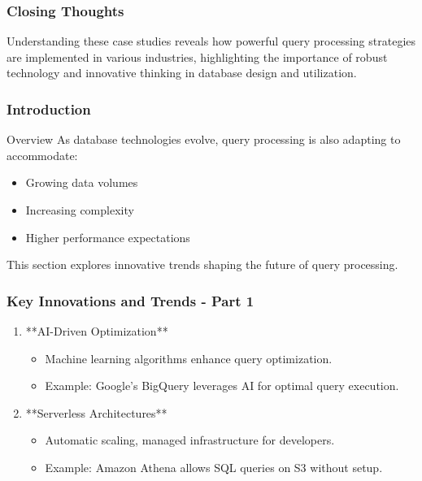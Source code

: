 \documentclass[aspectratio=169]{beamer}
\begin{document}
\begin{frame}
    \frametitle{Closing Thoughts}
    Understanding these case studies reveals how powerful query processing strategies are implemented in various industries, highlighting the importance of robust technology and innovative thinking in database design and utilization.
\end{frame}

\begin{frame}[fragile]
    \frametitle{Introduction}
    \begin{block}{Overview}
        As database technologies evolve, query processing is also adapting to accommodate:
        \begin{itemize}
            \item Growing data volumes
            \item Increasing complexity
            \item Higher performance expectations
        \end{itemize}
        This section explores innovative trends shaping the future of query processing.
    \end{block}
\end{frame}

\begin{frame}[fragile]
    \frametitle{Key Innovations and Trends - Part 1}
    \begin{enumerate}
        \item **AI-Driven Optimization**
        \begin{itemize}
            \item Machine learning algorithms enhance query optimization.
            \item Example: Google’s BigQuery leverages AI for optimal query execution.
        \end{itemize}

        \item **Serverless Architectures**
        \begin{itemize}
            \item Automatic scaling, managed infrastructure for developers.
            \item Example: Amazon Athena allows SQL queries on S3 without setup.
        \end{itemize}
    \end{enumerate}
\end{frame}
\end{document}
